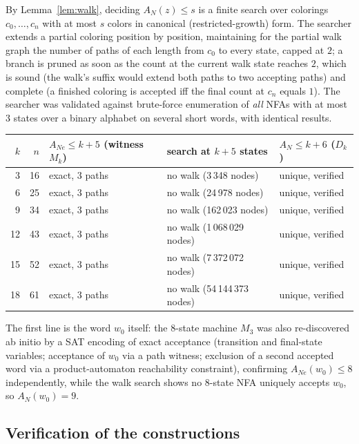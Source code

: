 \documentclass[11pt]{article}
\theoremstyle{definition}
\newcommand{\AN}{A_N}
\newcommand{\ANe}{A_{Ne}}
\begin{document}
By Lemma~\ref{lem:walk}, deciding $\AN(z)\le s$ is a finite search over
colorings $c_0,\dots,c_n$ with at most $s$ colors in canonical
(restricted-growth) form. The searcher extends a partial coloring position
by position, maintaining for the partial walk graph the number of paths of
each length from $c_0$ to every state, capped at $2$; a branch is pruned as
soon as the count at the current walk state reaches $2$, which is sound
(the walk's suffix would extend both paths to two accepting paths) and
complete (a finished coloring is accepted iff the final count at $c_n$
equals $1$). The searcher was validated against brute-force enumeration of
\emph{all} NFAs with at most $3$ states over a binary alphabet on several
short words, with identical results.

\begin{center}
\begin{tabular}{rrlll}
$k$ & $n$ & $\ANe\le k+5$ (witness $M_k$) & search at $k+5$ states & $\AN\le k+6$ ($D_k$)\\
\hline
3 & 16 & exact, 3 paths & no walk (3\,348 nodes) & unique, verified\\
6 & 25 & exact, 3 paths & no walk (24\,978 nodes) & unique, verified\\
9 & 34 & exact, 3 paths & no walk (162\,023 nodes) & unique, verified\\
12 & 43 & exact, 3 paths & no walk (1\,068\,029 nodes) & unique, verified\\
15 & 52 & exact, 3 paths & no walk (7\,372\,072 nodes) & unique, verified\\
18 & 61 & exact, 3 paths & no walk (54\,144\,373 nodes) & unique, verified\\
\end{tabular}
\end{center}

The first line is the word $w_0$ itself: the $8$-state machine $M_3$ was
also re-discovered ab initio by a SAT encoding of exact acceptance
(transition and final-state variables; acceptance of $w_0$ via a path
witness; exclusion of a second accepted word via a product-automaton
reachability constraint), confirming $\ANe(w_0)\le8$ independently, while
the walk search shows no $8$-state NFA uniquely accepts $w_0$, so
$\AN(w_0)=9$.

\subsection{Verification of the constructions}
\end{document}
